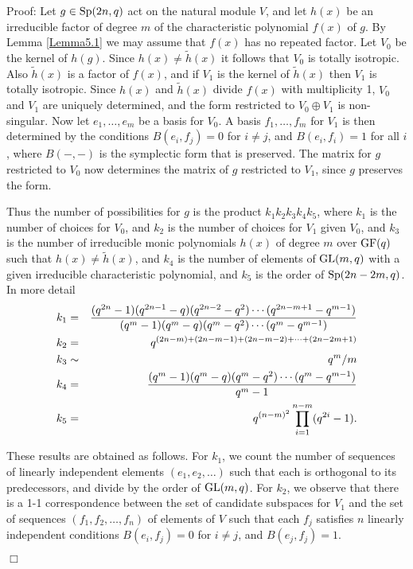\documentclass[12pt]{article}
\newenvironment{proof}{\normalsize {\sc Proof}:}{{\hfill $\Box$ \\}}
\def\GL{{\rm GL}}
\def\GF{{\rm GF}}
\def\Sp{{\rm Sp}}
\begin{document}
\begin{proof}
Let $g\in\Sp(2n,q)$ act on the natural module $V$, and let
$h(x)$ be an irreducible factor of degree $m$
of the characteristic polynomial
$f(x)$ of $g$. By Lemma \ref{Lemma5.1} we may assume that  
$f(x)$ has no repeated
factor. Let $V_0$ be the kernel of $h(g)$. Since    
$h(x)\ne \tilde{h}(x)$ it follows that $V_0$ is totally isotropic. Also
$\tilde{h}(x)$ is a factor of $f(x)$, and if  $V_1$ is the kernel of
$\tilde{h}(x)$ then $V_1$ is totally isotropic. Since $h(x)$ and
$\tilde{h}(x)$ divide $f(x)$ with multiplicity 1, $V_0$ and $V_1$ are
uniquely determined, and the form restricted to $V_0\oplus V_1$ is
non-singular. Now let $e_1,\ldots,e_m$ be a basis for $V_0$. A basis
$f_1,\ldots,f_m$ for $V_1$ is then determined by the conditions
$B(e_i,f_j)=0$ for $i \ne j$, and $B(e_i,f_i)=1$ for all $i$, where
$B(-,-)$ is the symplectic form that is preserved. The matrix for $g$
restricted to $V_0$ now determines the matrix of $g$ restricted to
$V_1$, since $g$ preserves the form. 

Thus the number of possibilities
for $g$ is the product  $k_1k_2k_3k_4k_5$, where $k_1$ is
the number of choices for $V_0$, and $k_2$ is the number of choices
for $V_1$ given $V_0$, and $k_3$ is the number of irreducible monic 
polynomials $h(x)$ of degree $m$ over $\GF(q)$  such that  $h(x)\ne
\tilde{h}(x)$, and $k_4$ is the number of elements of $\GL(m,q)$ with a
given irreducible characteristic polynomial, and $k_5$ is the order of
$\Sp(2n-2m,q)$. In more detail 
\begin{eqnarray*}
k_1 & = & {(q^{2n}-1)(q^{2n-1}-q)(q^{2n-2}-q^2)\cdots(q^{2n-m+1}-q^{m-1})\over
(q^m-1)(q^m-q)(q^m-q^2)\cdots(q^m-q^{m-1})} \\                   
k_2 & = & q^{(2n-m)+(2n-m-1)+(2n-m-2)+\cdots+(2n-2m+1)} \\
k_3 & \sim  & q^m/m \\
k_4 & = & {(q^m-1)(q^m-q)(q^m-q^2)\cdots(q^m-q^{m-1})\over q^m-1}\\
k_5 & = & q^{(n-m)^2} \prod_{i = 1}^{n - m}(q^{2i}-1). 
\end{eqnarray*}

These results are obtained as follows. For $k_1$, we count the number of
sequences of linearly  independent  elements $(e_1,e_2,\ldots)$  such
that each is orthogonal to its predecessors, and divide by the order
of $\GL(m,q)$. For $k_2$, we observe that there is a 1-1
correspondence between the set of candidate subspaces for $V_1$ and
the set of sequences $(f_1,f_2,\ldots,f_n)$ of elements of $V$ such that
each $f_j$ satisfies $n$ linearly independent conditions
$B(e_i,f_j)=0$ for $i \ne j$, and $B(e_j,f_j)=1$. 


\end{proof}
\end{document}
